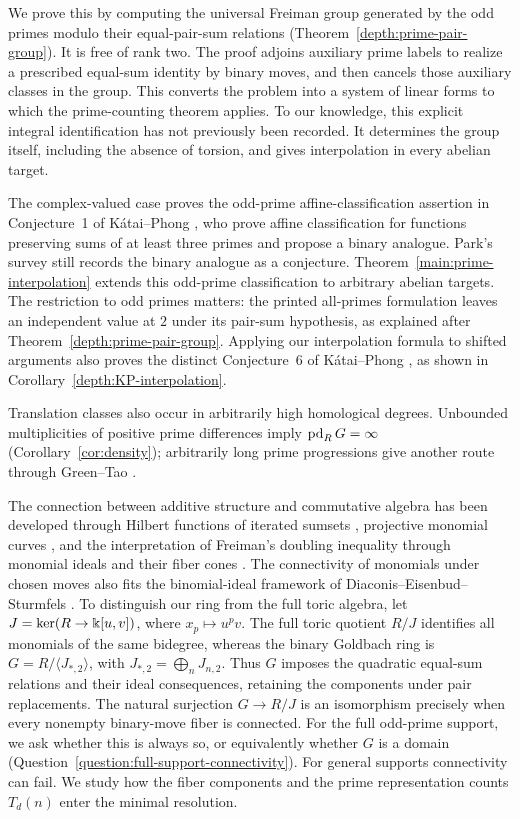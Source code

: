 We prove this by computing the universal Freiman group generated by the
odd primes modulo their equal-pair-sum relations
(Theorem~\ref{depth:prime-pair-group}). It is free of rank two.
The proof adjoins auxiliary prime labels to realize a prescribed
equal-sum identity by binary moves, and then cancels those auxiliary
classes in the group. This converts the problem into a system of
linear forms to which the prime-counting theorem applies.
To our knowledge, this explicit integral identification has not
previously been recorded. It determines the group itself, including
the absence of torsion, and gives interpolation in every abelian target.

The complex-valued case proves the odd-prime affine-classification
assertion in Conjecture~1 of K\'atai--Phong \cite[p.~469]{KP15}, who prove affine classification
for functions preserving sums of at least three primes and propose
a binary analogue. Park's survey \cite[p.~6, after Thm.~3.7]{Park25}
still records the binary analogue as a conjecture.
Theorem~\ref{main:prime-interpolation} extends this odd-prime
classification to arbitrary abelian targets. The restriction to odd
primes matters: the printed all-primes formulation leaves an
independent value at $2$ under its pair-sum hypothesis, as explained
after Theorem~\ref{depth:prime-pair-group}.
Applying our interpolation formula to shifted arguments also proves
the distinct Conjecture~6 of K\'atai--Phong
\cite[p.~235]{KP15Problems}, as shown in Corollary~\ref{depth:KP-interpolation}.

Translation classes also occur in arbitrarily high homological
degrees. Unbounded multiplicities of positive prime differences imply
$\operatorname{pd}_R G=\infty$ (Corollary~\ref{cor:density}); arbitrarily long prime
progressions give another route through Green--Tao \cite{GreenTao08}.

The connection between additive structure and commutative algebra has
been developed through Hilbert functions of iterated sumsets
\cite{EliahouMazumdar22}, projective monomial curves \cite{Elias22},
and the interpretation of Freiman's doubling inequality through
monomial ideals and their fiber cones \cite{HerzogHibiZhu}.
The connectivity of monomials under chosen moves also fits the
binomial-ideal framework of Diaconis--Eisenbud--Sturmfels \cite{DES98}.
To distinguish our ring from the full toric algebra, let
$J=\ker(R\to\Bbbk[u,v])$, where $x_p\mapsto u^pv$.
The full toric quotient $R/J$ identifies all monomials of the same
bidegree, whereas the binary Goldbach ring is
$G=R/\langle J_{*,2}\rangle$, with $J_{*,2}=\bigoplus_n J_{n,2}$.
Thus $G$ imposes the quadratic equal-sum relations and their ideal
consequences, retaining the components under pair replacements.
The natural surjection $G\to R/J$ is an isomorphism precisely when
every nonempty binary-move fiber is connected.
For the full odd-prime support, we ask whether this is always so, or
equivalently whether $G$ is a domain
(Question~\ref{question:full-support-connectivity}).
For general supports connectivity can fail. We study how the fiber
components and the prime representation counts $T_d(n)$ enter the
minimal resolution.

